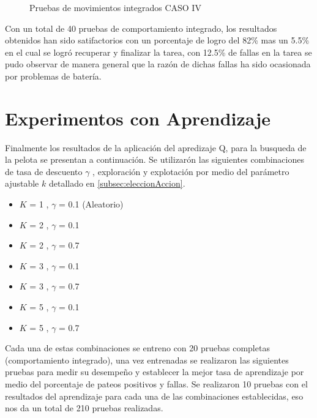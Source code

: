 \begin{figure}
\caption{Pruebas de movimientos integrados CASO IV}
\label{fig:caso4}
\end{figure} 

Con un total de 40 pruebas de comportamiento integrado, los resultados obtenidos han sido satifactorios con un porcentaje de logro del 82\% mas un 5.5\% en el cual se logró recuperar y finalizar la tarea, con 12.5\% de fallas en la tarea se pudo observar de manera general que la razón de dichas fallas ha sido ocasionada por problemas de batería.
 

\section{Experimentos con Aprendizaje}\label{sec:experimentosAprend}

Finalmente los resultados de la aplicaci\'on del apredizaje Q, para la busqueda de la pelota se presentan a continuaci\'on.
Se utilizar\'on las siguientes combinaciones de tasa de descuento $\gamma$ , exploraci\'on y explotaci\'on por medio del par\'ametro ajustable $k$ detallado en \ref{subsec:eleccionAccion}.

\begin{itemize}
\item $K$ = 1 , $\gamma$ = 0.1 (Aleatorio)
\item $K$ = 2 , $\gamma$ = 0.1 
\item $K$ = 2 , $\gamma$ = 0.7
\item $K$ = 3 , $\gamma$ = 0.1
\item $K$ = 3 , $\gamma$ = 0.7
\item $K$ = 5 , $\gamma$ = 0.1
\item $K$ = 5 , $\gamma$ = 0.7
   
\end{itemize}

Cada una de estas combinaciones se entreno con 20 pruebas completas (comportamiento integrado), una vez entrenadas se realizaron las siguientes pruebas para medir su desempeño y establecer la mejor tasa de aprendizaje por medio del porcentaje de pateos positivos y fallas. Se realizaron 10 pruebas con el resultados del aprendizaje para cada una de las combinaciones establecidas, eso nos da un total de 210 pruebas realizadas. 

